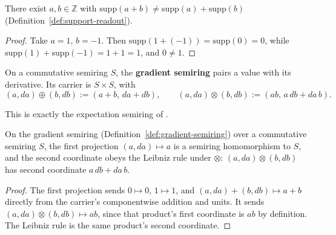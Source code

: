\begin{lemma}
\label{lem:support-fails-ring}
\leanok
There exist $a,b \in \mathbb Z$ with $\mathrm{supp}(a+b) \ne
\mathrm{supp}(a) + \mathrm{supp}(b)$ (Definition~\ref{def:support-readout}).
\end{lemma}

\begin{proof}
\leanok
Take $a=1$, $b=-1$. Then $\mathrm{supp}(1+(-1)) = \mathrm{supp}(0) = 0$,
while $\mathrm{supp}(1) + \mathrm{supp}(-1) = 1+1 = 1$, and $0 \ne 1$.
\end{proof}

\begin{definition}
\label{def:gradient-semiring}
\leanok
On a commutative semiring $S$, the \textbf{gradient semiring} pairs a
value with its derivative. Its carrier is $S \times S$, with
\[
  (a,da) \oplus (b,db) := (a+b,\, da+db), \qquad
  (a,da) \otimes (b,db) := (ab,\, a\,db + da\,b).
\]
\end{definition}

This is exactly the expectation semiring of
\citet{eisnerExpectationSemiring2002}.

\begin{lemma}
\label{lem:gradient-semiring-laws}
\leanok
On the gradient semiring (Definition~\ref{def:gradient-semiring}) over a
commutative semiring $S$, the first projection $(a,da) \mapsto a$ is a
semiring homomorphism to $S$, and the second coordinate obeys the
Leibniz rule under $\otimes$: $(a,da) \otimes (b,db)$ has second
coordinate $a\,db + da\,b$.
\end{lemma}

\begin{proof}
\leanok
The first projection sends $0 \mapsto 0$, $1 \mapsto 1$, and
$(a,da)+(b,db) \mapsto a+b$ directly from the carrier's componentwise
addition and units. It sends $(a,da) \otimes (b,db) \mapsto ab$, since
that product's first coordinate is $ab$ by definition. The Leibniz rule
is the same product's second coordinate.
\end{proof}

